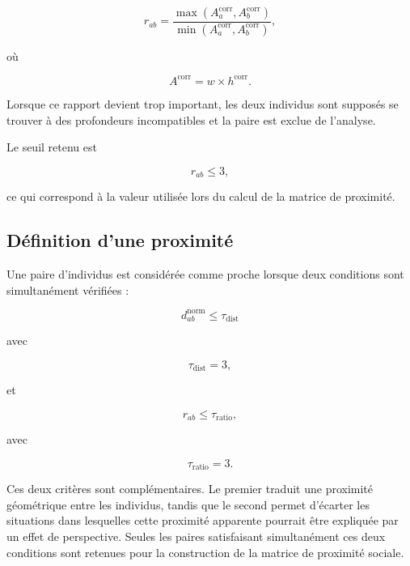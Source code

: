 \documentclass[11pt,a4paper]{report}
\begin{document}
\begin{equation}
r_{ab}
=
\frac{
\max\left(A_a^{\mathrm{corr}},
A_b^{\mathrm{corr}}\right)}
{
\min\left(A_a^{\mathrm{corr}},
A_b^{\mathrm{corr}}\right)},
\end{equation}

où

\begin{equation}
A^{\mathrm{corr}}
=
w\times h^{\mathrm{corr}}.
\end{equation}

Lorsque ce rapport devient trop important, les deux individus sont supposés se
trouver à des profondeurs incompatibles et la paire est exclue de l'analyse.

Le seuil retenu est

\begin{equation}
r_{ab}\leq3,
\end{equation}

ce qui correspond à la valeur utilisée lors du calcul de la matrice de proximité. 

\subsection*{Définition d'une proximité}

Une paire d'individus est considérée comme proche lorsque deux conditions sont
simultanément vérifiées :

\begin{equation}
d_{ab}^{\mathrm{norm}}
\leq
\tau_{\mathrm{dist}}
\end{equation}

avec

\[
\tau_{\mathrm{dist}}=3,
\]

et

\begin{equation}
r_{ab}
\leq
\tau_{\mathrm{ratio}},
\end{equation}

avec

\[
\tau_{\mathrm{ratio}}=3.
\]

Ces deux critères sont complémentaires. Le premier traduit une proximité
géométrique entre les individus, tandis que le second permet d'écarter les
situations dans lesquelles cette proximité apparente pourrait être expliquée par
un effet de perspective. Seules les paires satisfaisant simultanément ces deux
conditions sont retenues pour la construction de la matrice de proximité
sociale. 

\end{document}
